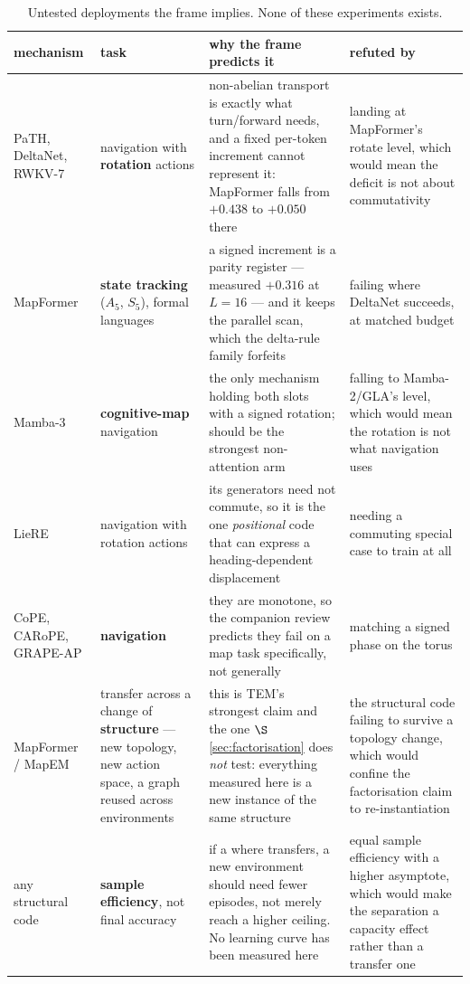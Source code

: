 \documentclass[11pt]{article}
\begin{document}
\begin{table}[htbp]\centering\small
\caption{Untested deployments the frame implies. None of these experiments exists.}
\label{tab:predictions}
\begin{tabular}{@{}p{2.9cm}p{3.2cm}p{4.2cm}p{3.5cm}@{}}
\toprule
mechanism & task & why the frame predicts it & refuted by \\
\midrule
PaTH, DeltaNet, RWKV-7 & navigation with \textbf{rotation} actions & non-abelian transport is exactly what turn/forward needs, and a fixed per-token increment cannot represent it: MapFormer falls from $+0.438$ to $+0.050$ there & landing at MapFormer's rotate level, which would mean the deficit is not about commutativity \\[3pt]
MapFormer & \textbf{state tracking} ($A_5$, $S_5$), formal languages & a signed increment is a parity register --- measured $+0.316$ at $L{=}16$ --- and it keeps the parallel scan, which the delta-rule family forfeits & failing where DeltaNet succeeds, at matched budget \\[3pt]
Mamba-3 & \textbf{cognitive-map} navigation & the only mechanism holding both slots with a signed rotation; should be the strongest non-attention arm & falling to Mamba-2/GLA's level, which would mean the rotation is not what navigation uses \\[3pt]
LieRE & navigation with rotation actions & its generators need not commute, so it is the one \emph{positional} code that can express a heading-dependent displacement & needing a commuting special case to train at all \\[3pt]
CoPE, CARoPE, GRAPE-AP & \textbf{navigation} & they are monotone, so the companion review predicts they fail on a map task specifically, not generally & matching a signed phase on the torus \\[3pt]
MapFormer / MapEM & transfer across a change of \textbf{structure} --- new topology, new action space, a graph reused across environments & this is TEM's strongest claim and the one $\S$\ref{sec:factorisation} does \emph{not} test: everything measured here is a new instance of the same structure & the structural code failing to survive a topology change, which would confine the factorisation claim to re-instantiation \\[3pt]
any structural code & \textbf{sample efficiency}, not final accuracy & if a where transfers, a new environment should need fewer episodes, not merely reach a higher ceiling. No learning curve has been measured here & equal sample efficiency with a higher asymptote, which would make the separation a capacity effect rather than a transfer one \\
\bottomrule
\end{tabular}
\end{table}
\end{document}
